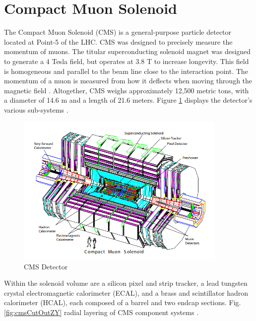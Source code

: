 \section{Compact Muon Solenoid}

The Compact Muon Solenoid (CMS) is a general-purpose particle detector located at Point-5 of the LHC. CMS was designed to precisely measure the momentum of muons. The titular superconducting solenoid magnet was designed to generate a 4 Tesla field, but operates at 3.8 T to increase longevity. This field is homogeneous and parallel to the beam line close to the interaction point. The momentum of a muon is measured from how it deflects when moving through the magnetic field \cite{CmsPTdrv2}. Altogether, CMS weighs approximately 12,500 metric tons, with a diameter of 14.6 m and a length of 21.6 meters. Figure \ref{fig:cmsCutOut} displays the detector's various sub-systems \cite{dEnterria:2007iyi}. 

\begin{figure}[]
\begin{centering}
\includegraphics[width=4in]{Chapter3/importfigs/fromCMS_DesignPaper_perspective.png}
\par\end{centering}
\caption{CMS Detector \cite{dEnterria:2007iyi} \label{fig:cmsCutOut}}
\end{figure}

Within the solenoid volume are a silicon pixel and strip tracker, a lead tungsten crystal electromagnetic calorimeter (ECAL), and a brass and scintillator hadron calorimeter (HCAL), each composed of a barrel and two endcap sections. Fig.\ref{fig:cmsCutOutZY} radial layering of CMS component systems \cite{10.1088/978-1-6817-4078-2ch4}.

